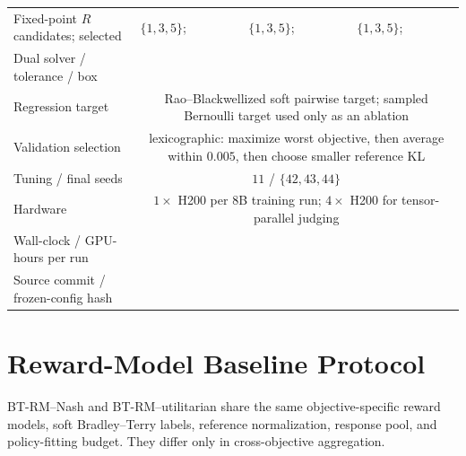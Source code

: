 \documentclass{article}
\theoremstyle{remark}
\theoremstyle{plain}
\newcommand{\pending}{\textemdash}
\begin{document}
\begin{table}[t]
\begin{tabular}{@{}p{}p{}p{}p{}@{}}
Fixed-point $R$ candidates; selected & $\{1,3,5\}$; \pending & $\{1,3,5\}$; \pending & $\{1,3,5\}$; \pending\\
Dual solver / tolerance / box & \pending & \pending & \pending\\
Regression target & \multicolumn{3}{c}{Rao--Blackwellized soft pairwise target; sampled Bernoulli target used only as an ablation}\\
Validation selection & \multicolumn{3}{c}{lexicographic: maximize worst objective, then average within $0.005$, then choose smaller reference KL}\\
Tuning / final seeds & \multicolumn{3}{c}{$11$ / $\{42,43,44\}$}\\
Hardware & \multicolumn{3}{c}{$1\times$ H200 per 8B training run; $4\times$ H200 for tensor-parallel judging}\\
Wall-clock / GPU-hours per run & \pending & \pending & \pending\\
Source commit / frozen-config hash & \pending & \pending & \pending\\
\bottomrule
\end{tabular}
\end{table}

\section{Reward-Model Baseline Protocol}
\label{app:rm-baselines}
BT-RM--Nash and BT-RM--utilitarian share the same objective-specific reward models, soft Bradley--Terry labels, reference normalization, response pool, and policy-fitting budget. They differ only in cross-objective aggregation.
\end{document}
